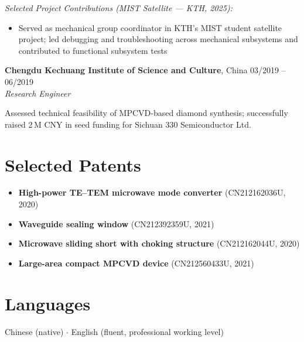 \documentclass[a4paper,11pt]{article}
\begin{document}
\medskip
\noindent\textit{Selected Project Contributions (MIST Satellite --- KTH, 2025):}
\begin{itemize}[noitemsep, topsep=2pt, leftmargin=*]
    \item Served as mechanical group coordinator in KTH's MIST student
          satellite project; led debugging and troubleshooting across
          mechanical subsystems and contributed to functional subsystem tests
\end{itemize}

\medskip
\noindent\textbf{Chengdu Kechuang Institute of Science and Culture}, China
\hfill 03/2019 -- 06/2019 \\
\textit{Research Engineer}

\noindent Assessed technical feasibility of MPCVD-based diamond synthesis;
successfully raised 2\,M CNY in seed funding for Sichuan 330 Semiconductor Ltd.

\section*{Selected Patents}

\begin{itemize}[noitemsep, topsep=2pt, leftmargin=*]
    \item \textbf{High-power TE--TEM microwave mode converter}
          (CN212162036U, 2020)
    \item \textbf{Waveguide sealing window} (CN212392359U, 2021)
    \item \textbf{Microwave sliding short with choking structure}
          (CN212162044U, 2020)
    \item \textbf{Large-area compact MPCVD device} (CN212560433U, 2021)
\end{itemize}

\section*{Languages}

Chinese (native) \enspace $\cdot$ \enspace English (fluent, professional working level)
\end{document}
